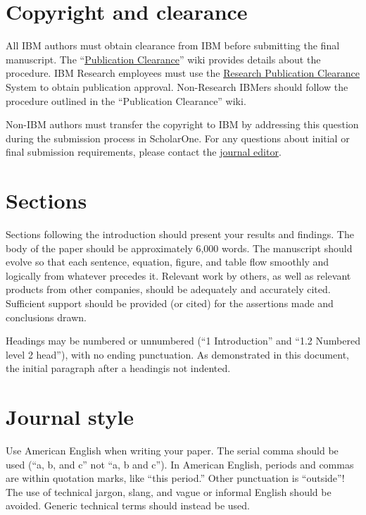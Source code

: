 \documentclass[]{IEEEibm}
\begin{document}
\section{Copyright and clearance}

All IBM authors must obtain clearance from IBM before submitting the final manuscript. The ``\href{https://apps.na.collabserv.com/wikis/home?lang=en-us#!/wiki/W18e544042a85_4b63_915a_1d1ed2cf8338/page/Publication\%20clearance}{Publication Clearance}'' wiki provides details about the procedure. IBM Research employees must use the \href{https://watapp.watson.ibm.com/publication/}{Research Publication Clearance} System to obtain publication approval. Non-Research IBMers should follow the procedure outlined in the ``Publication Clearance'' wiki.

Non-IBM authors must transfer the copyright to IBM by addressing this question during the submission process in ScholarOne. For any questions about initial or final submission requirements, please contact the \href{mailto:rdannuc@us.ibm.com}{journal editor}.

\section{Sections}

Sections following the introduction should present your results and findings. The body of the paper should be approximately 6,000 words. The manuscript should evolve so that each sentence, equation, figure, and table flow smoothly and logically from whatever precedes it. Relevant work by others, as well as relevant products from other companies, should be adequately and accurately cited. Sufficient support should be provided (or cited) for the assertions made and conclusions drawn.

Headings may be numbered or unnumbered (``1 Introduction'' and ``1.2 Numbered level 2 head''), with no ending punctuation. As demonstrated in this document, the initial paragraph after a headingis not indented.

\section{Journal style}

Use American English when writing your paper. The serial comma should be used (``a, b, and c'' not ``a, b and c''). In American English, periods and commas are within quotation marks, like ``this period.'' Other punctuation is ``outside''! The use of technical jargon, slang, and vague or informal English should be avoided. Generic technical terms should instead be used.
\end{document}
